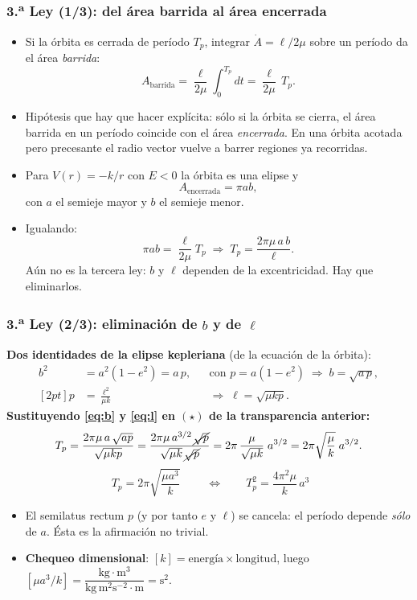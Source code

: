\documentclass[10pt]{beamer}
\begin{document}
\begin{frame}
\frametitle{3.\textsuperscript{a} Ley (1/3): del área barrida al área encerrada}
\begin{itemize}
  \item<1-> Si la órbita es \alert{cerrada} de período $T_p$, integrar
        $\dot A=\ell/2\mu$ sobre un período da el área \emph{barrida}:
        \[ A_{\text{barrida}}=\frac{\ell}{2\mu}\int_{0}^{T_p}dt
           =\frac{\ell}{2\mu}\,T_p . \]
  \item<2-> \alert{Hipótesis que hay que hacer explícita:} sólo si la órbita se
        cierra, el área barrida en un período coincide con el área
        \emph{encerrada}. En una órbita acotada pero precesante el radio vector
        vuelve a barrer regiones ya recorridas.
  \item<3-> Para $V(r)=-k/r$ con $E<0$ la órbita es una elipse y
        \[ A_{\text{encerrada}}=\pi a b , \]
        con $a$ el semieje mayor y $b$ el semieje menor.
  \item<4-> Igualando:
        \[ \pi a b=\frac{\ell}{2\mu}T_p
           \;\Longrightarrow\; T_p=\frac{2\pi\mu\,a\,b}{\ell}. \tag{$\star$} \]
        \alert{Aún no es la tercera ley:} $b$ y $\ell$ dependen de la
        excentricidad. Hay que eliminarlos.
\end{itemize}
\end{frame}

\begin{frame}
\frametitle{3.\textsuperscript{a} Ley (2/3): eliminación de $b$ y de $\ell$}
\textbf{Dos identidades de la elipse kepleriana} (de la ecuación de la órbita):
\begin{align}
  b^{2}&=a^{2}(1-e^{2})=a\,p, &&\text{con } p=a(1-e^{2}) \;\Rightarrow\;
  b=\sqrt{a\,p}, \label{eq:b} \\ [2pt]
  p&=\frac{\ell^{2}}{\mu k} &&\Rightarrow\; \ell=\sqrt{\mu k p}. \label{eq:l}
\end{align}
\pause
\textbf{Sustituyendo \eqref{eq:b} y \eqref{eq:l} en $(\star)$ de la transparencia anterior:}
\[
  T_p=\frac{2\pi\mu\,a\,\sqrt{a p}}{\sqrt{\mu k p}}
     =\frac{2\pi\mu\,a^{3/2}\,\cancel{\sqrt{p}}}{\sqrt{\mu k}\,\cancel{\sqrt{p}}}
     =2\pi\,\frac{\mu}{\sqrt{\mu k}}\;a^{3/2}
     =2\pi\sqrt{\frac{\mu}{k}}\;a^{3/2}.
\]
\pause
\[
  \boxed{\;T_p=2\pi\sqrt{\frac{\mu a^{3}}{k}}\;}
  \qquad\Longleftrightarrow\qquad T_p^{2}=\frac{4\pi^{2}\mu}{k}\,a^{3}
\]
\pause
\begin{itemize}
  \item El semilatus rectum $p$ (y por tanto $e$ y $\ell$) \alert{se cancela}:
        el período depende \emph{sólo} de $a$. Ésta es la afirmación no trivial.
  \item \textbf{Chequeo dimensional}: $[k]=\text{energía}\times\text{longitud}$,
        luego $[\mu a^{3}/k]=\dfrac{\text{kg}\cdot\text{m}^{3}}
        {\text{kg}\,\text{m}^{2}\text{s}^{-2}\cdot\text{m}}=\text{s}^{2}$.
        \checkmark
\end{itemize}
\end{frame}
\end{document}
